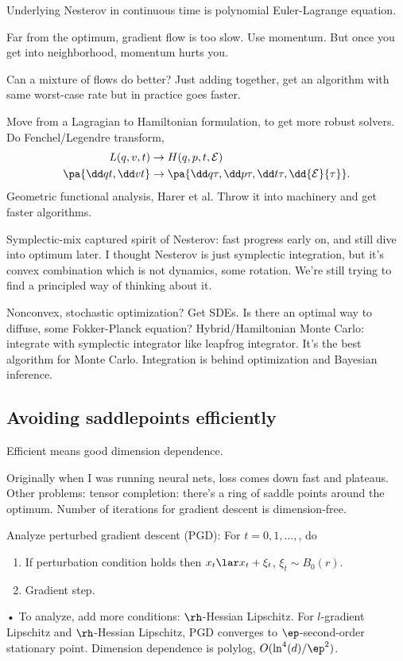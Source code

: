 Underlying Nesterov in continuous time is polynomial Euler-Lagrange equation.

Far from the optimum, gradient flow is too slow. Use momentum. But once you get into neighborhood, momentum hurts you.

Can a mixture of flows do better?
Just adding together, get an algorithm with same worst-case rate but in practice goes faster.

Move from a Lagragian to Hamiltonian formulation, to get more robust solvers. Do Fenchel/Legendre transform,
\begin{align}
L(q,v,t) &\to H(q,p,t,\cal E)\\
\pa{\dd qt, \dd vt} &\to \pa{\dd q\tau, \dd p\tau, \dd t\tau, \dd{\cal E}{\tau}}.
\end{align}
Geometric functional analysis, Harer et al. Throw it into machinery and get faster algorithms. 

Symplectic-mix captured spirit of Nesterov: fast progress early on, and still dive into optimum later.
I thought Nesterov is just symplectic integration, but it's  convex combination which is not dynamics, some rotation. We're still trying to find a principled way of thinking about it.

Nonconvex, stochastic optimization? Get SDEs. Is there an optimal way to diffuse, some Fokker-Planck equation? Hybrid/Hamiltonian Monte Carlo: integrate with symplectic integrator like leapfrog integrator. It's the best algorithm for Monte Carlo. 
Integration is behind optimization and Bayesian inference.

\subsection{Avoiding saddlepoints efficiently}

Efficient means good dimension dependence.

Originally when I was running neural nets, loss comes down fast and plateaus. Other problems: tensor completion: there's a ring of saddle points around the optimum. Number of iterations for gradient descent is dimension-free. 

Analyze perturbed gradient descent (PGD): For $t=0,1,\ldots,$, do
\begin{enumerate}
\item
If perturbation condition holds then $x_{t}\lar x_t + \xi_t$, $\xi_t\sim B_0(r)$.
\item
Gradient step.
\end{enumerate}•
To analyze, add more conditions: $\rh$-Hessian Lipschitz.
For $l$-gradient Lipschitz  and $\rh$-Hessian Lipschitz, 
PGD converges to $\ep$-second-order stationary point. 
Dimension dependence is polylog, $O(\ln^4(d)/\ep^2)$.

